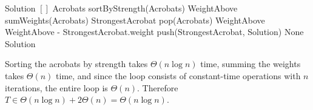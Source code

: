 \documentclass[11pt]{article}
\begin{document}
\begin{algorithm}[H]
\begin{algorithmic}
\State Solution \gets $[]$
\State Acrobats \gets sortByStrength(Acrobats) 
\State WeightAbove \gets sumWeights(Acrobats)
    \State StrongestAcrobat \gets pop(Acrobats)
    \State WeightAbove \gets WeightAbove - StrongestAcrobat.weight 
        \State push(StrongestAcrobat, Solution) 
    \Else  
        \State \Return None 
    \EndIf
\EndFor
\State \Return Solution
\end{algorithmic}
\end{algorithm}

Sorting the acrobats by strength takes $\Theta(n\log n)$ time, summing the weights takes $\Theta(n)$ time, and since the loop consists of constant-time operations with $n$ iterations, the entire loop is $\Theta(n)$. Therefore $T \in \Theta(n \log n) + 2\Theta (n) = \Theta(n \log n)$.
\end{document}
